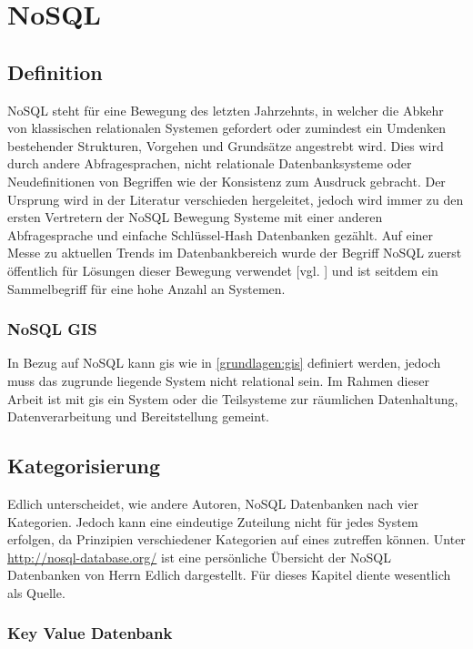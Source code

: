 \section{NoSQL}

\subsection{Definition}

NoSQL steht für eine Bewegung des letzten Jahrzehnts, in welcher die Abkehr von klassischen relationalen Systemen gefordert oder zumindest ein Umdenken bestehender Strukturen, Vorgehen und Grundsätze angestrebt wird.
Dies wird durch andere Abfragesprachen, nicht relationale Datenbanksysteme oder Neudefinitionen von Begriffen wie der Konsistenz zum Ausdruck gebracht.
Der Ursprung wird in der Literatur verschieden hergeleitet, jedoch wird immer zu den ersten Vertretern der NoSQL Bewegung Systeme mit einer anderen Abfragesprache und einfache Schlüssel-Hash Datenbanken gezählt.
Auf einer Messe zu aktuellen Trends im Datenbankbereich wurde der Begriff NoSQL zuerst öffentlich für Lösungen dieser Bewegung verwendet [vgl. \cite{website:originnosql}] und ist seitdem ein Sammelbegriff für eine hohe Anzahl an Systemen.

\subsubsection{NoSQL GIS}

In Bezug auf NoSQL kann \Gls{gis} wie in \ref{grundlagen:gis} definiert werden, jedoch muss das zugrunde liegende System nicht relational sein.
Im Rahmen dieser Arbeit ist mit \Gls{gis} ein System oder die Teilsysteme zur räumlichen Datenhaltung, Datenverarbeitung und Bereitstellung gemeint.

\subsection{Kategorisierung}
Edlich unterscheidet, wie andere Autoren, NoSQL Datenbanken nach vier Kategorien.
Jedoch kann eine eindeutige Zuteilung nicht für jedes System erfolgen, da Prinzipien verschiedener Kategorien auf eines zutreffen können.
Unter \url{http://nosql-database.org/} ist eine persönliche Übersicht der NoSQL Datenbanken von Herrn Edlich dargestellt.
Für dieses Kapitel diente wesentlich \cite{beamer:nosql} als Quelle.


\subsubsection{Key Value Datenbank}

